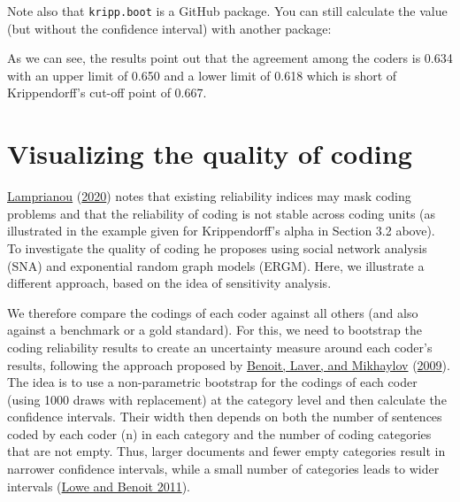 \documentclass[
]{book}
\newenvironment{Shaded}{\begin{snugshade}}{\end{snugshade}}
\newcommand{\AttributeTok}[1]{\textcolor[rgb]{0.77,0.63,0.00}{#1}}
\newcommand{\FunctionTok}[1]{\textcolor[rgb]{0.00,0.00,0.00}{#1}}
\newcommand{\NormalTok}[1]{#1}
\newcommand{\OtherTok}[1]{\textcolor[rgb]{0.56,0.35,0.01}{#1}}
\newcommand{\SpecialCharTok}[1]{\textcolor[rgb]{0.00,0.00,0.00}{#1}}
\newcommand{\StringTok}[1]{\textcolor[rgb]{0.31,0.60,0.02}{#1}}
\begin{document}
Note also that \texttt{kripp.boot} is a GitHub package. You can still calculate the value (but without the confidence interval) with another package:

\begin{Shaded}
\end{Shaded}

As we can see, the results point out that the agreement among the coders is 0.634 with an upper limit of 0.650 and a lower limit of 0.618 which is short of Krippendorff's cut-off point of 0.667.

\hypertarget{visualizing-the-quality-of-coding}{%
\section{Visualizing the quality of coding}\label{visualizing-the-quality-of-coding}}

\protect\hyperlink{ref-Lamprianou2020}{Lamprianou} (\protect\hyperlink{ref-Lamprianou2020}{2020}) notes that existing reliability indices may mask coding problems and that the reliability of coding is not stable across coding units (as illustrated in the example given for Krippendorff's alpha in Section 3.2 above). To investigate the quality of coding he proposes using social network analysis (SNA) and exponential random graph models (ERGM). Here, we illustrate a different approach, based on the idea of sensitivity analysis.

We therefore compare the codings of each coder against all others (and also against a benchmark or a gold standard). For this, we need to bootstrap the coding reliability results to create an uncertainty measure around each coder's results, following the approach proposed by \protect\hyperlink{ref-Benoit2009a}{Benoit, Laver, and Mikhaylov} (\protect\hyperlink{ref-Benoit2009a}{2009}). The idea is to use a non-parametric bootstrap for the codings of each coder (using 1000 draws with replacement) at the category level and then calculate the confidence intervals. Their width then depends on both the number of sentences coded by each coder (n) in each category and the number of coding categories that are not empty. Thus, larger documents and fewer empty categories result in narrower confidence intervals, while a small number of categories leads to wider intervals (\protect\hyperlink{ref-Lowe2011a}{Lowe and Benoit 2011}).
\end{document}
